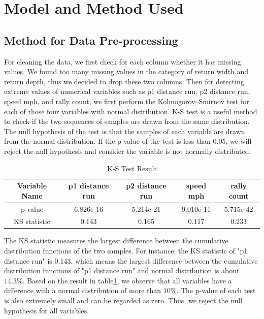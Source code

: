 \documentclass[12pt]{article}
\begin{document}
\pagebreak
\section{Model and Method Used}
\subsection{Method for Data Pre-processing}
\quad For cleaning the data, we first check for each column whether it has missing values. We found too many missing 
values in the category of return width and return depth, thus we decided to drop these two columns. Then for detecting extreme values of numerical variables such as 
p1 distance run, p2 distance run, speed mph, and rally count, we first perform the Kolmogorov–Smirnov test for each of those four 
variables with normal distribution. K-S test is a useful method to check if the two sequences of samples are drawn from the same distribution. 
The null hypothesis of the test is that the samples of each variable are drawn from the normal distribution. If the p-value of the test is 
less than 0.05, we will reject the null hypothesis and consider the variable is not normally distributed. 
\begin{table}[h!]
\centering
\begin{tabular}{||c c c c c||} 
 \hline
 \textbf{Variable Name} & \textbf{p1 distance run} & \textbf{p2 distance run} & \textbf{speed mph} & \textbf{rally count} \\ [0.5ex] 
 \hline\hline
 p-value & 6.826e-16 & 5.214e-21 & 9.010e-11 & 5.715e-42 \\ 
 \hline
 KS statistic & 0.143 & 0.165 & 0.117 & 0.233 \\
[1ex]
 \hline
\end{tabular}
\caption{K-S Test Result}
\label{table:1}
\end{table}

The KS statistic measures the largest difference between the cumulative distribution functions of the two samples. For instance, the KS statistic of
"p1 distance run" is 0.143, which means the largest difference between the cumulative distribution functions of "p1 distance run" and normal distribution
is about $14.3\%$. Based on the result in table\ref{table:1}, we observe that all variables have a difference with a normal distribution of more than $10\%$.
The p-value of each test is also extremely small and can be regarded as zero. Thus, we reject the null hypothesis for all variables.
\end{document}
